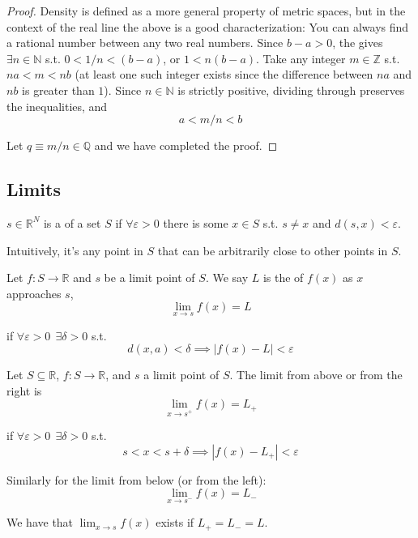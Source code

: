 \documentclass{article}
\begin{document}
\begin{proof}
  Density is defined as a more general property of metric spaces, but in the context of the real line the above is a good characterization: You can always find a rational number between any two real numbers.  Since $b - a > 0$, the  gives $\exists n \in \mathbb{N}$ s.t. $0 < 1/n < (b - a)$, or $1 < n(b - a)$. Take any integer $m \in \mathbb{Z}$ s.t. $na < m < nb$ (at least one such integer exists since the difference between $na$ and $nb$ is greater than $1$). Since $n \in \mathbb{N}$ is strictly positive, dividing  through preserves the inequalities, and
  \[
    a < m/n < b
  \]

  Let $q \equiv m/n \in \mathbb{Q}$ and we have completed the proof.
\end{proof}

\subsection{Limits}
\label{sub:limits}

\begin{definition}
  $s \in \mathbb{R}^N$ is a  of a set $S$ if $\forall \varepsilon > 0$ there is some $x \in S$ s.t. $s \ne x$ and $d(s, x) < \varepsilon$.
\end{definition}

Intuitively, it's any point in $S$ that can be arbitrarily close to other points in $S$.
\begin{definition}
  Let $f: S \to \mathbb{R}$ and $s$ be a limit point of $S$. We say $L$ is the  of $f(x)$ as $x$ approaches $s$,
  \[
    \lim_{x \to s} f(x) = L
  \]

  if $\forall \varepsilon > 0 ~~ \exists \delta > 0$ s.t.
  \[
    d(x, a) < \delta \implies |f(x) - L| < \varepsilon
  \]
\end{definition}

\begin{definition}
  Let $S \subseteq \mathbb{R}$, $f: S \to \mathbb{R}$, and $s$ a limit point of $S$. The limit from above or from the right is
  \[
    \lim_{x \to s^+} f(x) = L_+
  \]

  if $\forall \varepsilon > 0 ~~ \exists \delta > 0$ s.t.
  \[
    s < x < s + \delta
    \implies
    |f(x) - L_+| < \varepsilon
  \]

  Similarly for the limit from below (or from the left):
  \[
    \lim_{x \to s^-} f(x) = L_-
  \]

  We have that $\lim_{x \to s} f(x)$ exists if $L_{+} = L_{-} = L$.
\end{definition}
\end{document}

